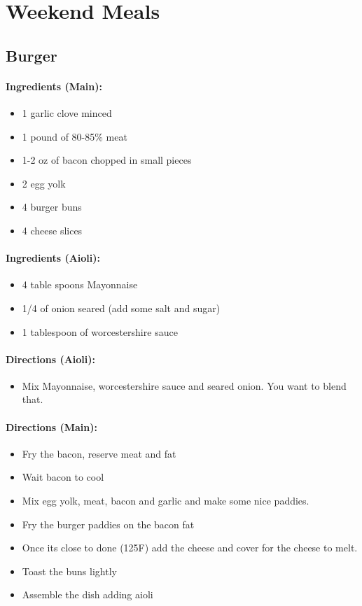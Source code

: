 \documentclass{article}
\begin{document}
\section{Weekend Meals}


\subsection{Burger} 

\paragraph{Ingredients (Main):}
\begin{itemize}
    \item 1 garlic clove minced
    \item 1 pound of 80-85\% meat
    \item 1-2 oz of bacon chopped in small pieces
    \item 2 egg yolk
    \item 4 burger buns
    \item 4 cheese slices
\end{itemize}  

\paragraph{Ingredients (Aioli):}
\begin{itemize}
    \item 4 table spoons Mayonnaise
    \item 1/4 of onion seared (add some salt and sugar)
    \item 1 tablespoon of worcestershire sauce
\end{itemize}  

\paragraph{Directions (Aioli):}
\begin{itemize}
    \item Mix Mayonnaise, worcestershire sauce and seared onion. You want to blend that.
\end{itemize}  

\paragraph{Directions (Main):}
\begin{itemize}
    \item Fry the bacon, reserve meat and fat
    \item Wait bacon to cool
    \item Mix egg yolk, meat, bacon and garlic and make some nice paddies.
    \item Fry the burger paddies on the bacon fat
    \item Once its close to done (125F) add the cheese and cover for the cheese to melt.
    \item Toast the buns lightly
    \item Assemble the dish adding aioli
\end{itemize} 
\end{document}
